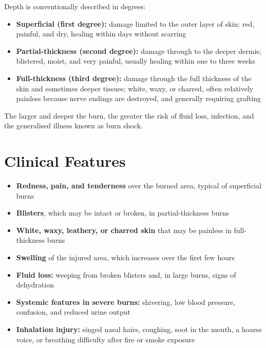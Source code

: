 Depth is conventionally described in degrees:
\begin{itemize}
    \item \textbf{Superficial (first degree):} damage limited to the outer layer of skin; red, painful, and dry, healing within days without scarring
    \item \textbf{Partial-thickness (second degree):} damage through to the deeper dermis; blistered, moist, and very painful, usually healing within one to three weeks
    \item \textbf{Full-thickness (third degree):} damage through the full thickness of the skin and sometimes deeper tissues; white, waxy, or charred, often relatively painless because nerve endings are destroyed, and generally requiring grafting
\end{itemize}

The larger and deeper the burn, the greater the risk of fluid loss, infection, and the generalised illness known as burn shock.

\section*{Clinical Features}
\begin{itemize}
    \item \textbf{Redness, pain, and tenderness} over the burned area, typical of superficial burns
    \item \textbf{Blisters}, which may be intact or broken, in partial-thickness burns
    \item \textbf{White, waxy, leathery, or charred skin} that may be painless in full-thickness burns
    \item \textbf{Swelling} of the injured area, which increases over the first few hours
    \item \textbf{Fluid loss:} weeping from broken blisters and, in large burns, signs of dehydration
    \item \textbf{Systemic features in severe burns:} shivering, low blood pressure, confusion, and reduced urine output
    \item \textbf{Inhalation injury:} singed nasal hairs, coughing, soot in the mouth, a hoarse voice, or breathing difficulty after fire or smoke exposure
\end{itemize}

